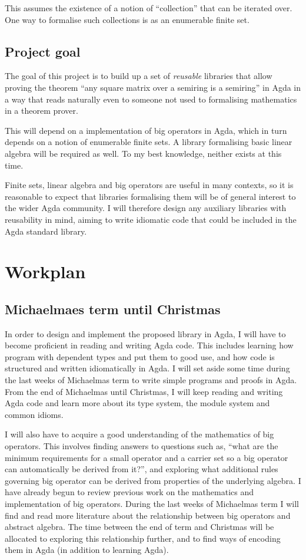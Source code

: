\documentclass[a4paper]{scrartcl}
\begin{document}
This assumes the existence of a notion of \enquote{collection} that can be iterated over. One way to formalise such collections is as an enumerable finite set.

\subsection{Project goal}

The goal of this project is to build up a set of \emph{reusable} libraries that allow proving the theorem \enquote{any square matrix over a semiring is a semiring} in Agda in a way that reads naturally even to someone not used to formalising mathematics in a theorem prover.

This will depend on a implementation of big operators in Agda, which in turn depends on a notion of enumerable finite sets. A library formalising basic linear algebra will be required as well. To my best knowledge, neither exists at this time.

Finite sets, linear algebra and big operators are useful in many contexts, so it is reasonable to expect that libraries formalising them will be of general interest to the wider Agda community. I will therefore design any auxiliary libraries with reusability in mind, aiming to write idiomatic code that could be included in the Agda standard library.

\section{Workplan}
\label{workplan}

\subsection{Michaelmaes term until Christmas}

In order to design and implement the proposed library in Agda, I will have to become proficient in reading and writing Agda code. This includes learning how program with dependent types and put them to good use, and how code is structured and written idiomatically in Agda. I will set aside some time during the last weeks of Michaelmas term to write simple programs and proofs in Agda. From the end of Michaelmas until Christmas, I will keep reading and writing Agda code and learn more about its type system, the module system and common idioms.

I will also have to acquire a good understanding of the mathematics of big operators. This involves finding answers to questions such as, \enquote{what are the minimum requirements for a small operator and a carrier set so a big operator can automatically be derived from it?}, and exploring what additional rules governing big operator can be derived from properties of the underlying algebra. I have already begun to review previous work on the mathematics and implementation of big operators. During the last weeks of Michaelmas term I will find and read more literature about the relationship between big operators and abstract algebra. The time between the end of term and Christmas will be allocated to exploring this relationship further, and to find ways of encoding them in Agda (in addition to learning Agda).
\end{document}
